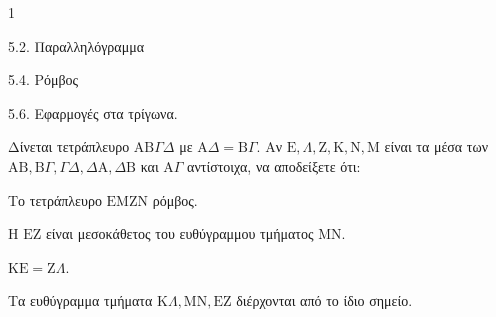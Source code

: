 \begin{ylh}{1}
    \item 5.2. Παραλληλόγραμμα
    \item 5.4. Ρόμβος
    \item 5.6. Εφαρμογές στα τρίγωνα.
\end{ylh}
Δίνεται τετράπλευρο $\mathrm{A}\mathrm{B}\Gamma\Delta$ με $\mathrm{A}\Delta = \mathrm{B}\Gamma$. Αν $\mathrm{E}, \Lambda, \mathrm{Z}, \mathrm{K}, \mathrm{N}, \mathrm{M}$ είναι τα μέσα των $\mathrm{A}\mathrm{B}, \mathrm{B}\Gamma, \Gamma\Delta, \Delta\mathrm{A}, \Delta\mathrm{B}$ και $\mathrm{A}\Gamma$ αντίστοιχα, να αποδείξετε ότι:
\begin{alist}
    \item Το τετράπλευρο $\mathrm{E}\mathrm{M}\mathrm{Z}\mathrm{N}$ ρόμβος. 
    \item Η $\mathrm{E}\mathrm{Z}$ είναι μεσοκάθετος του ευθύγραμμου τμήματος $\mathrm{M}\mathrm{N}$. 
    \item $\mathrm{K}\mathrm{E} = \mathrm{Z}\Lambda$. 
    \item Τα ευθύγραμμα τμήματα $\mathrm{K}\Lambda, \mathrm{M}\mathrm{N}, \mathrm{E}\mathrm{Z}$ διέρχονται από το ίδιο σημείο. 
\end{alist}
